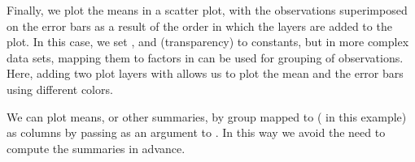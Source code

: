 \documentclass[krantz2]{krantz}\usepackage{knitr}
\begin{document}
Finally, we plot the means in a scatter plot, with the observations superimposed on the error bars as a result of the order in which the layers are added to the plot. In this case, we set ,  and  (transparency) to constants, but in more complex data sets, mapping them to factors in  can be used for grouping of observations. Here, adding two plot layers with  allows us to plot the mean and the error bars using different colors.

\begin{knitrout}\footnotesize
{}\color{fgcolor}\begin{kframe}
\begin{alltt}
\hlstd{(}  \hlstd{(}    \hlopt{+}
  \hlstd{(} \hlstd{=} \hlstd{,}  \hlstd{=} \hlstd{,}
                \hlstd{=} \hlstd{,}  \hlstd{=} \hlstd{)} \hlopt{+}
  \hlstd{(} \hlstd{=} \hlstd{,}
                \hlstd{=} \hlstd{,}
                \hlstd{=} \hlstd{,}  \hlstd{=} \hlstd{,}  \hlstd{=} \hlstd{)} \hlopt{+}
  \hlstd{(} \hlstd{=} \hlstd{,}  \hlstd{=} \hlstd{)}
\end{alltt}
\end{kframe}
\end{knitrout}

We can plot means, or other summaries, by group mapped to  ( in this example) as columns by passing  as an argument to  . In this way we avoid the need to compute the summaries in advance.
\end{document}
